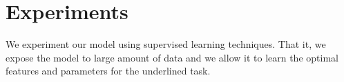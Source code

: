 \documentclass[master]{thesis-uestc}
\begin{document}

\section{Experiments}
We experiment our model using supervised learning techniques. That it, we expose the model to large amount of data and we allow it to learn the optimal features and parameters for the underlined task.
\end{document}
